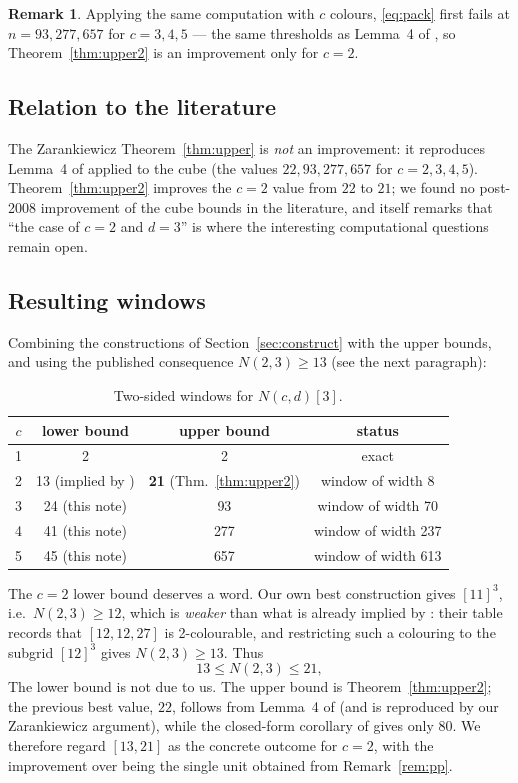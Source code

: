 \documentclass[11pt]{article}
\theoremstyle{definition}
\newtheorem{remark}[theorem]{Remark}
\newcommand{\Ncd}{N(c,d)}
\begin{document}
\begin{remark}
Applying the same computation with $c$ colours, \eqref{eq:pack} first fails at
$n=93,277,657$ for $c=3,4,5$ --- the same thresholds as Lemma~4 of \cite{CFP}, so
Theorem~\ref{thm:upper2} is an improvement only for $c=2$.
\end{remark}

\subsection{Relation to the literature}
The Zarankiewicz Theorem~\ref{thm:upper} is \emph{not} an improvement: it reproduces
Lemma~4 of \cite{CFP} applied to the cube (the values $22,93,277,657$ for $c=2,3,4,5$).
Theorem~\ref{thm:upper2} improves the $c=2$ value from $22$ to $21$; we found no
post-2008 improvement of the cube bounds in the literature, and \cite{CFP} itself remarks
that ``the case of $c=2$ and $d=3$'' is where the interesting computational questions
remain open.

\subsection{Resulting windows}
Combining the constructions of Section~\ref{sec:construct} with the upper bounds, and
using the published consequence $N(2,3)\ge13$ (see the next paragraph):

\begin{table}[h]
\centering
\begin{tabular}{cccc}
\toprule
$c$ & lower bound & upper bound & status \\
\midrule
1 & 2 & 2 & exact \\
2 & 13 (implied by \cite[Fig.~3]{CFP}) & \textbf{21} (Thm.~\ref{thm:upper2}) & window of width 8 \\
3 & 24 (this note) & 93 & window of width 70 \\
4 & 41 (this note) & 277 & window of width 237 \\
5 & 45 (this note) & 657 & window of width 613 \\
\bottomrule
\end{tabular}
\caption{Two-sided windows for $\Ncd[3]$.}
\label{tab:windows}
\end{table}

The $c=2$ lower bound deserves a word. Our own best construction gives $[11]^3$, i.e.\
$N(2,3)\ge12$, which is \emph{weaker} than what is already implied by \cite{CFP}: their
table records that $[12,12,27]$ is 2-colourable, and restricting such a colouring to the
subgrid $[12]^3$ gives $N(2,3)\ge13$. Thus
\[
13\le N(2,3)\le 21,
\]
The lower bound is not due to us. The upper bound is Theorem~\ref{thm:upper2}; the
previous best value, $22$, follows from Lemma~4 of \cite{CFP} (and is reproduced by our
Zarankiewicz argument), while the closed-form corollary of \cite{CFP} gives only $80$.
We therefore regard $[13,21]$ as the concrete outcome for $c=2$, with the improvement over
\cite{CFP} being the single unit obtained from Remark~\ref{rem:pp}.
\end{document}
